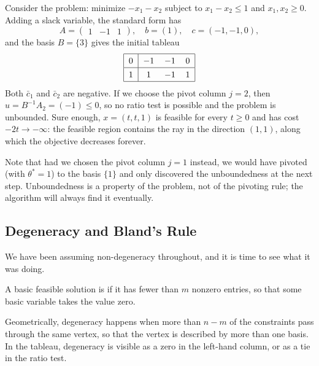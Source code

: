 \begin{example}
    Consider the problem: minimize $-x_1 - x_2$ subject to $x_1 - x_2 \leq 1$ and $x_1, x_2 \geq 0$. Adding a slack variable, the standard form has
    $$
    A = \begin{pmatrix}1 & -1 & 1\end{pmatrix}, \quad b = (1), \quad c = (-1,-1,0),
    $$
    and the basis $B = \{3\}$ gives the initial tableau
    $$
    \arraycolsep=6pt\def\arraystretch{1.3}
    \begin{array}{|c|ccc|}\hline
        0 & -1 & -1 & 0\\\hline
        1 & 1 & -1 & 1\\\hline
    \end{array}
    $$
    Both $\bar c_1$ and $\bar c_2$ are negative. If we choose the pivot column $j = 2$, then $u = B^{-1}A_2 = (-1) \leq 0$, so no ratio test is possible and the problem is unbounded. Sure enough, $x = (t, t, 1)$ is feasible for every $t \geq 0$ and has cost $-2t \rightarrow -\infty$: the feasible region contains the ray in the direction $(1,1)$, along which the objective decreases forever.

    Note that had we chosen the pivot column $j = 1$ instead, we would have pivoted (with $\theta^* = 1$) to the basis $\{1\}$ and only discovered the unboundedness at the next step. Unboundedness is a property of the problem, not of the pivoting rule; the algorithm will always find it eventually.
\end{example}

\subsection{Degeneracy and Bland's Rule}
\label{sec:degeneracy}

We have been assuming non-degeneracy throughout, and it is time to see what it was doing.

\begin{definition}[Degeneracy]
    A basic feasible solution is  if it has fewer than $m$ nonzero entries, so that some basic variable takes the value zero.
\end{definition}

Geometrically, degeneracy happens when more than $n - m$ of the constraints pass through the same vertex, so that the vertex is described by more than one basis. In the tableau, degeneracy is visible as a zero in the left-hand column, or as a tie in the ratio test.

